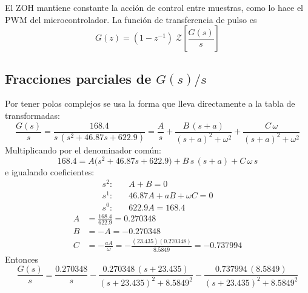 \documentclass[11pt,letterpaper]{article}
\begin{document}
El ZOH mantiene constante la acción de control entre muestras, como lo hace el
PWM del microcontrolador. La función de transferencia de pulso es
\begin{equation}
  G(z) = (1 - z^{-1})\;\mathcal{Z}\!\left[\frac{G(s)}{s}\right]
  \label{eq:zoh}
\end{equation}

\subsection{Fracciones parciales de $G(s)/s$}
Por tener polos complejos se usa la forma que lleva directamente a la tabla de
transformadas:
\begin{equation}
  \frac{G(s)}{s} = \frac{168.4}{s\,(s^2+46.87s+622.9)}
  = \frac{A}{s} + \frac{B\,(s+a)}{(s+a)^2+\omega^2} + \frac{C\,\omega}{(s+a)^2+\omega^2}
\end{equation}
Multiplicando por el denominador común:
\begin{equation}
  168.4 = A\bigl(s^2 + 46.87s + 622.9\bigr) + B\,s\,(s+a) + C\,\omega\,s
\end{equation}
e igualando coeficientes:
\begin{align}
  s^2:&\quad A + B = 0\\
  s^1:&\quad 46.87A + aB + \omega C = 0\\
  s^0:&\quad 622.9A = 168.4
\end{align}
\begin{align}
  A &= \frac{168.4}{622.9} = 0.270348\\
  B &= -A = -0.270348\\
  C &= -\frac{aA}{\omega} = -\frac{(23.435)(0.270348)}{8.5849} = -0.737994
\end{align}
Entonces
\begin{equation}
  \frac{G(s)}{s} = \frac{0.270348}{s}
  - \frac{0.270348\,(s+23.435)}{(s+23.435)^2 + 8.5849^2}
  - \frac{0.737994\,(8.5849)}{(s+23.435)^2 + 8.5849^2}
\end{equation}
\end{document}
